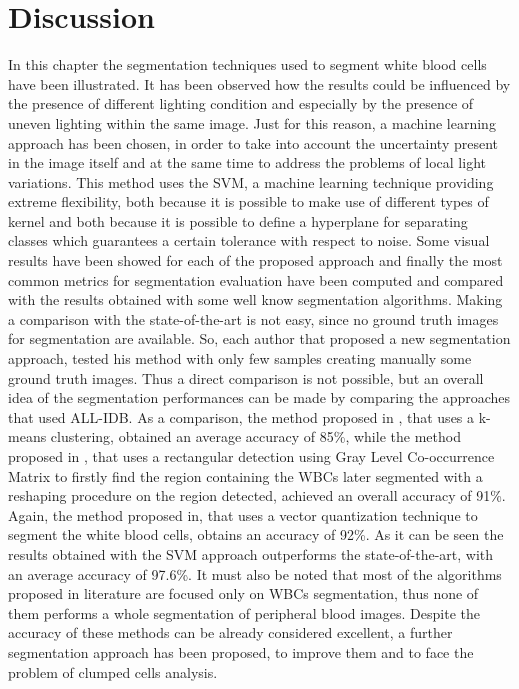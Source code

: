 \documentclass[final,a4paper,12pt,english]{UnicaPhdThesis3}
\begin{document}
\section{Discussion}\label{sec:Discussion}
In this chapter the segmentation techniques used to segment white blood cells have been illustrated.
It has been observed how the results could be influenced by the presence of different lighting condition and especially by the presence of uneven lighting within the same image. Just for this reason, a machine learning approach has been chosen, in order to take into account the uncertainty present in the image itself and at the same time to address the problems of local light variations. This method uses the SVM, a machine learning technique providing extreme flexibility, both because it is possible to make use of different types of kernel and both because it is possible to define a hyperplane for separating classes which guarantees a certain tolerance with respect to noise. Some visual results have been showed for each of the proposed approach and finally the most common metrics for segmentation evaluation have been computed and compared with the results obtained with some well know segmentation algorithms. Making a comparison with the state-of-the-art is not easy, since no ground truth images for segmentation are available. So, each author that proposed a new segmentation approach, tested his method with only few samples creating manually some ground truth images. Thus a direct comparison is not possible, but an overall idea of the segmentation performances can be made by comparing the approaches that used ALL-IDB. As a comparison, the method proposed in \cite{Rawat}, that uses a k-means clustering, obtained an average accuracy of 85\%, while the method proposed in \cite{Alilou}, that uses a rectangular detection using Gray Level Co-occurrence Matrix to firstly find the region containing the WBCs later segmented with a reshaping procedure on the region detected, achieved an overall accuracy of 91\%. Again, the method proposed in\cite{Kekre}, that uses a vector quantization technique to segment the white blood cells, obtains an accuracy of 92\%. As it can be seen the results obtained with the SVM approach outperforms the state-of-the-art, with an average accuracy of 97.6\%. It must also be noted that most of the algorithms proposed in literature are focused only on WBCs segmentation, thus none of them performs a whole segmentation of peripheral blood images.
Despite the accuracy of these methods can be already considered excellent, a further segmentation approach has been proposed, to improve them and to face the problem of clumped cells analysis.
\end{document}
